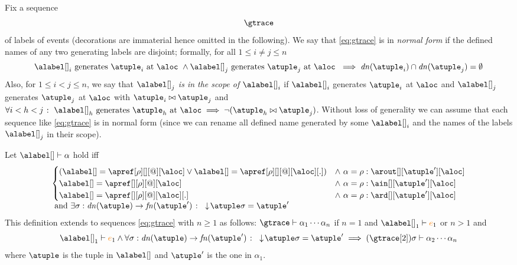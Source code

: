 Fix a sequence
\begin{align}
  \label{eq:gtrace}
  \gtrace  
\end{align}
of labels of events (decorations are immaterial hence omitted in the
following).
%
We say that \eqref{eq:gtrace} is in \emph{normal form} if the defined
names of any two generating labels are disjoint; formally, for all
$1 \leq i \neq j \leq n$
%
\[
  \alabel[]_i \text{ generates
  $\atuple_i$ at $\aloc$ } \land \alabel[]_j \text{ generates
  $\atuple_j$ at $\aloc$ } \implies \dn{\atuple_i} \cap \dn{\atuple_j}
= \emptyset
\]
%
Also, for $1 \leq i < j \leq n$, we say that $\alabel[]_j$ \emph{is in
  the scope of $\alabel[]_i$} if $\alabel[]_i$ generates $\atuple_i$
at $\aloc$ and $\alabel[]_j$ generates $\atuple_j$ at $\aloc$ with
$\atuple_i \matches \atuple_j$ and
$\forall i < h < j \qst \alabel[]_h \text{ generates } \atuple_h
\text{ at } \aloc \implies \neg(\atuple_h \matches \atuple_j)$.
%
Without loss of generality we can assume that each sequence like
\eqref{eq:gtrace} is in normal form (since we can rename all defined
name generated by some $\alabel[]_i$ and the names of the labels
$\alabel[]_j$ in their scope).

Let $\alabel[] \vdash \alpha$ hold iff
\[\begin{array}{l}
  \begin{cases}
    (\alabel[] = \apref[\arole][][@][\aloc] \vee \alabel[] = \apref[\arole][][@][\aloc][.]) & \land\ \alpha = \arole : \arout[][\atuple'][\aloc]
    \\
    \alabel[] = \apref[][\arole][@][\aloc] & \land\ \alpha = \arole : \ain[][\atuple'][\aloc]
    \\
    \alabel[] = \apref[][\arole][@][\aloc][.] & \land\ \alpha = \arole : \ard[][\atuple'][\aloc]
  \end{cases}
    \\
  \text{ and }
  \exists \sigma: \dn{\atuple} \to \fn{\atuple'} \qst \eraseB{\atuple}\sigma = \atuple'
  \end{array}
\]
This definition extends to sequences \eqref{eq:gtrace} with $n \geq 1$
as follows:
$\gtrace \vdash \alpha_1 \cdots \alpha_n$ if
$n = 1$  and $\alabel[]_1 \vdash \ae_1$ or
$n > 1$ and
\[
  \alabel[]_1 \vdash \ae_1 \land  \forall \sigma: \dn{\atuple} \to \fn{\atuple'} \qst \eraseB{\atuple}\sigma = \atuple'
  \implies (\gtrace[2])\sigma \vdash \alpha_2 \cdots \alpha_n
\]
where $\atuple$ is the tuple in $\alabel[]$ and $\atuple'$ is the one in $\alpha_1$.

